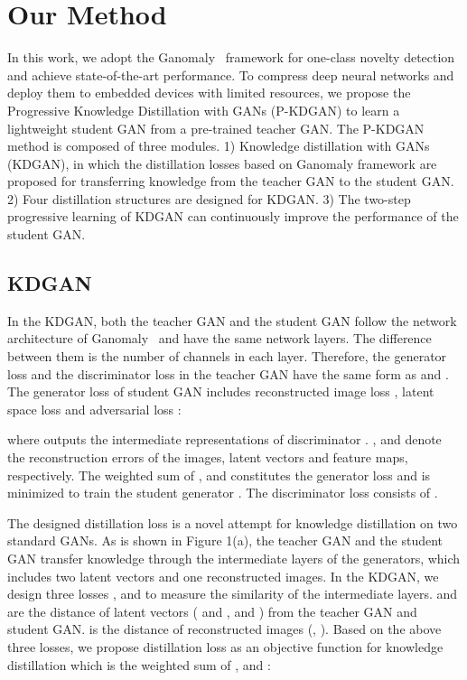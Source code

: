 \documentclass{article}
\begin{document}
\section{Our Method}
	In this work, we adopt the Ganomaly~\cite{ganomaly:2018} framework for one-class novelty detection and achieve state-of-the-art performance. To compress deep neural networks and deploy them to embedded devices with limited resources, we propose the Progressive Knowledge Distillation with GANs (P-KDGAN) to learn a lightweight student GAN from a pre-trained teacher GAN. The P-KDGAN method is composed of three modules. 1) Knowledge distillation with GANs (KDGAN), in which the distillation losses based on Ganomaly framework are proposed for transferring knowledge from the teacher GAN to the student GAN. 2) Four distillation structures are designed for KDGAN. 3) The two-step progressive learning of KDGAN can continuously improve the performance of the student GAN.
	
	
	\subsection{KDGAN}
	In the KDGAN, both the teacher GAN and the student GAN follow the network architecture of Ganomaly~\cite{ganomaly:2018} and have the same network layers. The difference between them is the number of channels in each layer. Therefore, the generator loss  and the discriminator loss  in the teacher GAN have the same form as  and . The generator loss  of student GAN includes reconstructed image loss , latent space loss  and adversarial loss :
	
	
	
	
	
	
	
	
	
	where  outputs the intermediate representations of discriminator . ,  and  denote the reconstruction errors of the images, latent vectors and feature maps, respectively. The weighted sum of ,  and  constitutes the generator loss  and is minimized to train the student generator . The discriminator loss  consists of .
	
	The designed distillation loss  is a novel attempt for knowledge distillation on two standard GANs. As is shown in Figure 1(a), the teacher GAN and the student GAN transfer knowledge through the intermediate layers of the generators, which includes two latent vectors and one reconstructed images. In the KDGAN, we design three losses ,  and  to measure the similarity of the intermediate layers.  and  are the  distance of latent vectors ( and ,  and ) from the teacher GAN and student GAN.  is the  distance of reconstructed images (, ). Based on the above three losses, we propose distillation loss  as an objective function for knowledge distillation which is the weighted sum of ,  and :   
	
\end{document}
